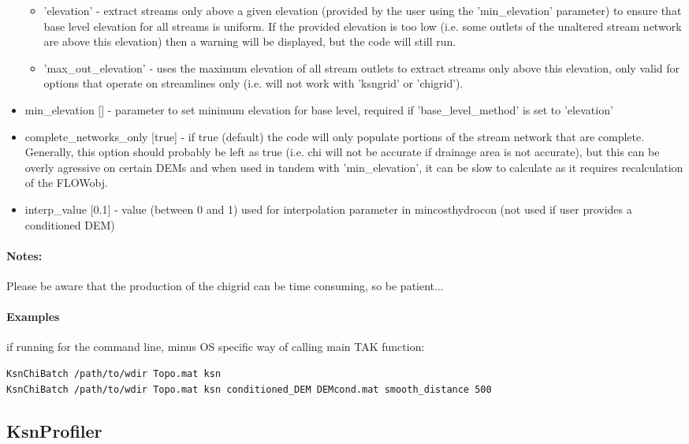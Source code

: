 \begin{itemize}
\begin{itemize}
\item 'elevation' - extract streams only above a given elevation (provided by the user using the 'min\_elevation' parameter) to ensure that base level
elevation for all streams is uniform. If the provided elevation is too low (i.e. some outlets of the unaltered stream network are above this
elevation) then a warning will be displayed, but the code will still run.
\item 'max\_out\_elevation' - uses the maximum elevation of all stream outlets to extract streams only above this elevation, only valid for options that operate
on streamlines only (i.e. will not work with 'ksngrid' or 'chigrid').
\end{itemize}
\item min\_elevation [] - parameter to set minimum elevation for base level, required if 'base\_level\_method' is set to 'elevation'
\item complete\_networks\_only [true] - if true (default) the code will only populate portions of the stream network that are complete. Generally, this
option should probably be left as true (i.e. chi will not be accurate if drainage area is not accurate), but this can be overly agressive
on certain DEMs and when used in tandem with 'min\_elevation', it can be slow to calculate as it requires recalculation of the FLOWobj.
\item interp\_value [0.1] - value (between 0 and 1) used for interpolation parameter in mincosthydrocon (not used if user provides a conditioned DEM)
\end{itemize}

\paragraph{Notes:}
Please be aware that the production of the chigrid can be time consuming, so be patient...

\paragraph{Examples} if running for the command line, minus OS specific way of calling main TAK function:
\begin{lstlisting}[language=bash]
KsnChiBatch /path/to/wdir Topo.mat ksn
KsnChiBatch /path/to/wdir Topo.mat ksn conditioned_DEM DEMcond.mat smooth_distance 500
\end{lstlisting}

\subsection{KsnProfiler}
